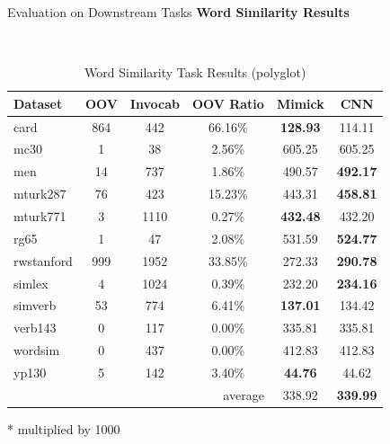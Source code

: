 \documentclass{beamer}
\begin{document}
\begin{frame}{Evaluation on Downstream Tasks}
    \textbf{Word Similarity Results}
    \begin{table}[!ht]
        \footnotesize
        \begin{threeparttable} 
        \begin{center}
          \caption{Word Similarity Task Results (polyglot)}
          ~\\
          \label{tab:wordsim:polyglot}
          \begin{tabular}{l|c|c|c|c|c}
            \textbf{Dataset} & \textbf{OOV} & \textbf{Invocab} & \textbf{OOV Ratio} & \textbf{Mimick}\tnote{*} & \textbf{CNN}\tnote{*}\\
            \hline
            card & 864 & 442 & 66.16\% & \textbf{128.93} & 114.11\\
            mc30 & 1 & 38 & 2.56\% & 605.25 & 605.25\\
            men & 14 & 737 & 1.86\% & 490.57 & \textbf{492.17}\\
            mturk287 & 76 & 423 & 15.23\% & 443.31 & \textbf{458.81}\\
            mturk771 & 3 & 1110 & 0.27\% & \textbf{432.48} & 432.20\\
            rg65 & 1 & 47 & 2.08\% & 531.59 & \textbf{524.77}\\
            rwstanford & 999 & 1952 & 33.85\% & 272.33 & \textbf{290.78}\\
            simlex & 4 & 1024 & 0.39\% & 232.20 & \textbf{234.16}\\
            simverb & 53 & 774 & 6.41\% & \textbf{137.01} & 134.42\\
            verb143 & 0 & 117 & 0.00\% & 335.81 & 335.81\\
            wordsim & 0 & 437 & 0.00\% & 412.83 & 412.83\\
            yp130 & 5 & 142 & 3.40\% & \textbf{44.76} & 44.62\\
            \hline
            \multicolumn{4}{r|}{average} & 338.92 & \textbf{339.99}\\
          \end{tabular}
          \begin{tablenotes}
            \item[*] multiplied by 1000
          \end{tablenotes}
        \end{center}
      \end{threeparttable} 
      \end{table}
\end{frame}
\end{document}
